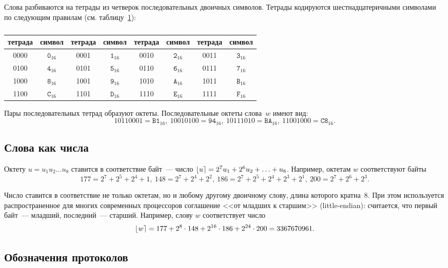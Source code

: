 Слова разбиваются на тетрады из четверок последовательных двоичных символов.
%
Тетрады кодируются шестнадцатеричными символами по следующим правилам
(см. таблицу~\ref{Table.Hex}):

\begin{table}[H]
\caption{}\label{Table.Hex}
\begin{tabular}{|c|c||c|c||c|c||c|c|}
\hline
тетрада & символ & тетрада & символ & тетрада & символ & тетрада & символ\\
\hline
\hline
0000 & $\texttt{0}_{16}$ & 0001 & $\texttt{1}_{16}$ & 
0010 & $\texttt{2}_{16}$ & 0011 & $\texttt{3}_{16}$\\
0100 & $\texttt{4}_{16}$ & 0101 & $\texttt{5}_{16}$ & 
0110 & $\texttt{6}_{16}$ & 0111 & $\texttt{7}_{16}$\\ 
1000 & $\texttt{8}_{16}$ & 1001 & $\texttt{9}_{16}$ & 
1010 & $\texttt{A}_{16}$ & 1011 & $\texttt{B}_{16}$\\ 
1100 & $\texttt{C}_{16}$ & 1101 & $\texttt{D}_{16}$ & 
1110 & $\texttt{E}_{16}$ & 1111 & $\texttt{F}_{16}$\\ 
\hline
\end{tabular}
\end{table}

Пары последовательных тетрад образуют октеты.
Последовательные октеты слова~$w$ имеют вид:
$$
1011 0001=\texttt{B1}_{16},\ 
1001 0100=\texttt{94}_{16},\ 
1011 1010=\texttt{BA}_{16},\  
1100 1000=\texttt{C8}_{16}.
$$

\subsection{Слова как числа}

Октету $u=u_1 u_2\ldots u_8$ ставится в соответствие байт~--- 
число $\lfloor u\rceil=2^7u_1+2^6 u_2+\ldots + u_8$. 
Например, октетам $w$ соответствуют байты
$$
177=2^7+2^5+2^4+1,\ 
148=2^7+2^4+2^2,\ 
186=2^7+2^5+2^4+2^3+2^1,\ 
200=2^7+2^6+2^3.
$$

Число ставится в соответствие не только октетам, но и любому другому
двоичному слову, длина которого кратна~$8$. 
%
При этом используется распространенное для многих современных 
процессоров соглашение <<от младших к старшим>> (little-endian):
считается, что первый байт~--- младший, последний~--- старший.
Например, слову $w$ соответствует число
$$
\lfloor w\rceil=177+2^{8}\cdot 148+2^{16}\cdot 186+2^{24}\cdot 200 = 3367670961.
$$

\subsection{Обозначения протоколов}

